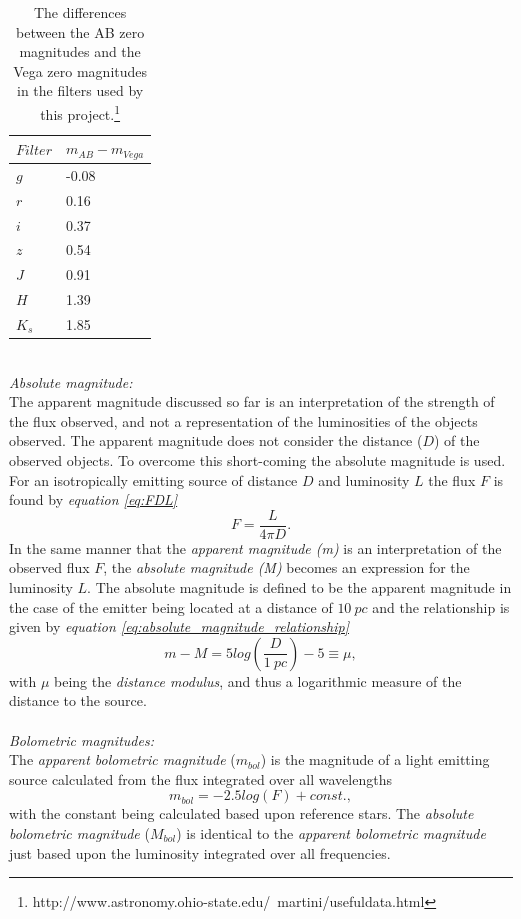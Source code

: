 \documentclass[a4paper, 12pt, twoside]{article}
\begin{document}
\begin{table}
\caption[The differences between the AB zero magnitudes and the Vega zero magnitudes in the filters used by this project]{The differences between the AB zero magnitudes and the Vega zero magnitudes in the filters used by this project.\footnote{http://www.astronomy.ohio-state.edu/~martini/usefuldata.html}}
\begin{tabular}{|l|l|}
\hline
$Filter$ & $m_{AB}-m_{Vega}$ \\
\hline
\hline
$g$ & -0.08 \\
\hline
$r$ & 0.16 \\
\hline
$i$ & 0.37 \\
\hline
$z$ & 0.54 \\
\hline
$J$ & 0.91 \\
\hline
$H$ & 1.39 \\
\hline
$K_{s}$ & 1.85 \\
\hline
\end{tabular}
\label{tab:Vega_AB_conversion}
\end{table}
\\
\emph{Absolute magnitude:} \\
The apparent magnitude discussed so far is an interpretation of the strength of the flux observed, and not a representation of the luminosities of the objects observed. The apparent magnitude does not consider the distance ($D$) of the observed objects. To overcome this short-coming the absolute magnitude is used. For an isotropically emitting source of distance $D$ and luminosity $L$ the flux $F$ is found by \emph{equation \ref{eq:FDL}}
\begin{equation}
F = \frac{L}{4\pi D}.
\label{eq:FDL}
\end{equation}
In the same manner that the \emph{apparent magnitude (m)} is an interpretation of the observed flux $F$, the \emph{absolute magnitude (M)} becomes an expression for the luminosity $L$. The absolute magnitude is defined to be the apparent magnitude in the case of the emitter being located at a distance of $10\ pc$ and the relationship is given by \emph{equation \ref{eq:absolute_magnitude_relationship}}
\begin{equation}
m - M = 5log(\frac{D}{1\ pc}) - 5 \equiv \mu,
\label{eq:absolute_magnitude_relationship}
\end{equation}
with $\mu$ being the \emph{distance modulus}, and thus a logarithmic measure of the distance to the source. \\
\\
\emph{Bolometric magnitudes:} \\
The \emph{apparent bolometric magnitude} ($m_{bol}$) is the magnitude of a light emitting source calculated from the flux integrated over all wavelengths 
\begin{equation}
m_{bol} = -2.5log(F) + const.,
\label{eq:m_bol}
\end{equation}
with the constant being calculated based upon reference stars. The \emph{absolute bolometric magnitude} ($M_{bol}$) is identical to the \emph{apparent bolometric magnitude} just based upon the luminosity integrated over all frequencies. 
\end{document}
